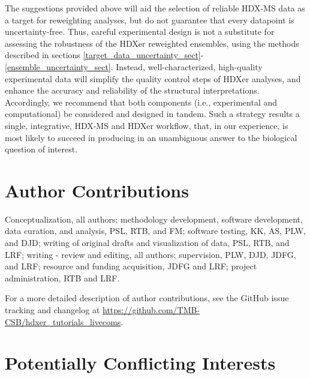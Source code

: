 \documentclass[9pt,tutorial]{livecoms}
\newcommand{\githubrepository}{\url{https://github.com/TMB-CSB/hdxer_tutorials_livecoms}}
\begin{document}
The suggestions provided above will aid the selection of reliable HDX-MS data as a target for reweighting analyses, but do not guarantee that every datapoint is uncertainty-free.
Thus, careful experimental design is not a substitute for assessing the robustness of the HDXer reweighted ensembles, using the methods described in sections \ref{target_data_uncertainty_sect}-\ref{ensemble_uncertainty_sect}.
Instead, well-characterized, high-quality experimental data will simplify the quality control steps of HDXer analyses, and enhance the accuracy and reliability of the structural interpretations.
Accordingly, we recommend that both components (i.e., experimental and computational) be considered and designed in tandem.
Such a strategy results a single, integrative, HDX-MS and HDXer workflow, that, in our experience, is most likely to succeed in producing in an unambiguous answer to the biological question of interest.


\section{Author Contributions}
%

Conceptualization, all authors; methodology development, software development, data curation, and analysis, PSL, RTB, and FM; software testing, KK, AS, PLW, and DJD; writing of original drafts and visualization of data, PSL, RTB, and LRF; writing - review and editing, all authors; supervision, PLW, DJD, JDFG, and LRF; resource and funding acquisition, JDFG and LRF; project administration, RTB and LRF.

For a more detailed description of author contributions,
see the GitHub issue tracking and changelog at \githubrepository.

\section{Potentially Conflicting Interests}
\end{document}
